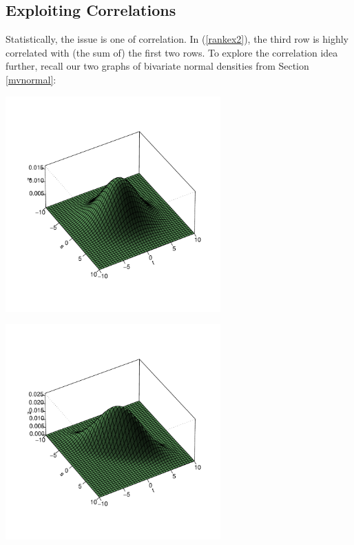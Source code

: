 \subsection{Exploiting Correlations}
\label{explorecorr}

Statistically, the issue is one of correlation.  In (\ref{rankex2}), the
third row is highly correlated with (the sum of) the first two rows.  To
explore the correlation idea further, recall our two graphs of bivariate
normal densities from Section \ref{mvnormal}:

\begin{minipage}[b]{0.65\linewidth}
    \mbox{\includegraphics[width=3.25in]{Images/Rho2.pdf}} 
\end{minipage}
\hspace{0.0in}
\begin{minipage}[b]{0.65\linewidth}
    \mbox{\includegraphics[width=3.25in]{Images/Rho8.pdf}} 
\end{minipage}

